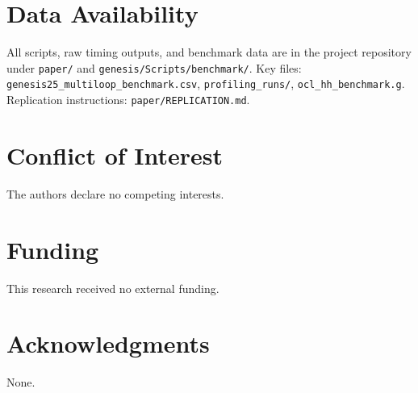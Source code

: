 \documentclass[11pt,a4paper]{article}
\begin{document}
\section*{Data Availability}

All scripts, raw timing outputs, and benchmark data are in the project repository
under \texttt{paper/} and \texttt{genesis/Scripts/benchmark/}.
Key files: \texttt{genesis25\_multiloop\_benchmark.csv}, \texttt{profiling\_runs/},
\texttt{ocl\_hh\_benchmark.g}.
Replication instructions: \texttt{paper/REPLICATION.md}.

\section*{Conflict of Interest}

The authors declare no competing interests.

\section*{Funding}

This research received no external funding.

\section*{Acknowledgments}

None.
\end{document}
